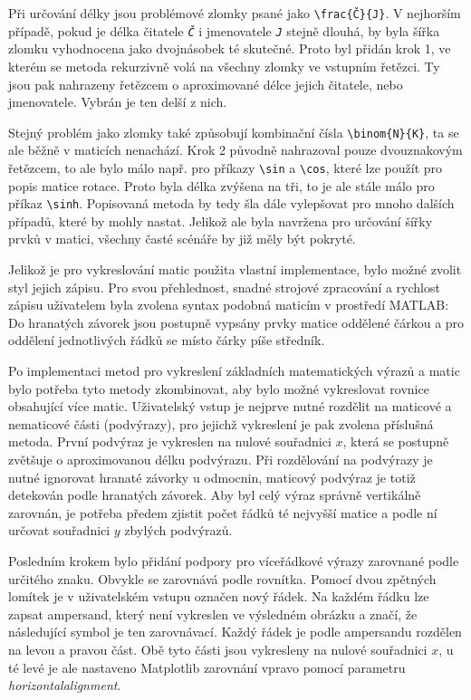 \documentclass[FM]{tulthesis}
\begin{document}
	Při určování délky jsou problémové zlomky psané jako \verb|\frac{Č}{J}|. V nejhorším případě, pokud je délka čitatele \textit{\texttt{Č}} i jmenovatele \textit{\texttt{J}} stejně dlouhá, by byla šířka zlomku vyhodnocena jako dvojnásobek té skutečné. Proto byl přidán krok 1, ve kterém se metoda rekurzivně volá na všechny zlomky ve vstupním řetězci. Ty jsou pak nahrazeny řetězcem o aproximované délce jejich čitatele, nebo jmenovatele. Vybrán je ten delší z nich.

	Stejný problém jako zlomky také způsobují kombinační čísla \verb|\binom{N}{K}|, ta se ale běžně v maticích nenachází. Krok 2 původně nahrazoval pouze dvouznakovým řetězcem, to ale bylo málo např. pro příkazy \verb|\sin| a \verb|\cos|, které lze použít pro popis matice rotace. Proto byla délka zvýšena na tři, to je ale stále málo pro příkaz \verb|\sinh|. Popisovaná metoda by tedy šla dále vylepšovat pro mnoho dalších případů, které by mohly nastat. Jelikož ale byla navržena pro určování šířky prvků v matici, všechny časté scénáře by již měly být pokryté.

	Jelikož je pro vykreslování matic použita vlastní implementace, bylo možné zvolit styl jejich zápisu. Pro svou přehlednost, snadné strojové zpracování a rychlost zápisu uživatelem byla zvolena syntax podobná maticím v prostředí MATLAB: Do hranatých závorek jsou postupně vypsány prvky matice oddělené čárkou a pro oddělení jednotlivých řádků se místo čárky píše středník.

	Po implementaci metod pro vykreslení základních matematických výrazů a matic bylo potřeba tyto metody zkombinovat, aby bylo možné vykreslovat rovnice obsahující více matic. Uživatelský vstup je nejprve nutné rozdělit na maticové a nematicové části (podvýrazy), pro jejichž vykreslení je pak zvolena příslušná metoda. První podvýraz je vykreslen na nulové souřadnici $x$, která se postupně zvětšuje o aproximovanou délku podvýrazu. Při rozdělování na podvýrazy je nutné ignorovat hranaté závorky u odmocnin, maticový podvýraz je totiž detekován podle hranatých závorek. Aby byl celý výraz správně vertikálně zarovnán, je potřeba předem zjistit počet řádků té nejvyšší matice a podle ní určovat souřadnici $y$ zbylých podvýrazů.
	
	Posledním krokem bylo přidání podpory pro víceřádkové výrazy zarovnané podle určitého znaku. Obvykle se zarovnává podle rovnítka. Pomocí dvou zpětných lomítek je v uživatelském vstupu označen nový řádek. Na každém řádku lze zapsat ampersand, který není vykreslen ve výsledném obrázku a značí, že následující symbol je ten zarovnávací. Každý řádek je podle ampersandu rozdělen na levou a pravou část. Obě tyto části jsou vykresleny na nulové souřadnici $x$, u té levé je ale nastaveno Matplotlib zarovnání vpravo pomocí parametru \textit{horizontalalignment}.
	
\end{document}
